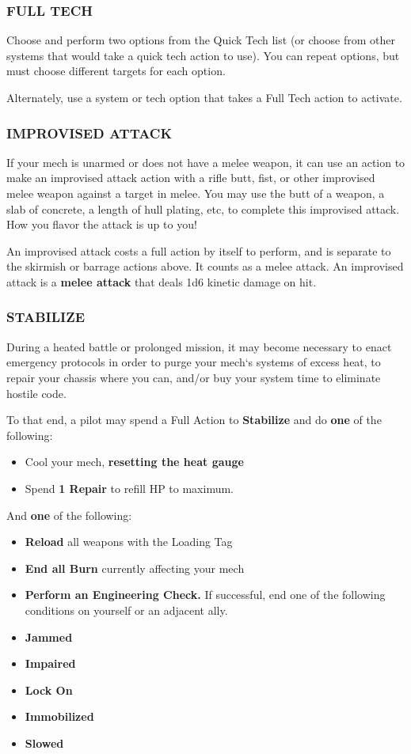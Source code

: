 \subsubsection{FULL TECH}
Choose and perform two options from the Quick Tech list (or choose from other systems that would take a quick tech action to use). You can repeat options, but must choose different targets for each option.

Alternately, use a system or tech option that takes a Full Tech action to activate.

\subsubsection{IMPROVISED ATTACK}

If your mech is unarmed or does not have a melee weapon, it can use an action to make an improvised attack action with a rifle butt, fist, or other improvised melee weapon against a target in melee. You may use the butt of a weapon, a slab of concrete, a length of hull plating, etc, to complete this improvised attack. How you flavor the attack is up to you!

An improvised attack costs a full action by itself to perform, and is separate to the skirmish or barrage actions above. It counts as a melee attack. An improvised attack is a \textbf{melee attack} that deals 1d6 kinetic damage on hit.

\subsubsection{STABILIZE}
During a heated battle or prolonged mission, it may become necessary to enact emergency protocols in order to purge your mech‘s systems of excess heat, to repair your chassis where you can, and/or buy your system time to eliminate hostile code.

To that end, a pilot may spend a Full Action to \textbf{Stabilize} and do \textbf{one} of the following:
\begin{itemize}
    \item Cool your mech, \textbf{resetting the heat gauge}
    \item Spend \textbf{1 Repair} to refill HP to maximum.
\end{itemize}
And \textbf{one} of the following:
\begin{itemize}
    \item \textbf{Reload} all weapons with the Loading Tag
    \item \textbf{End all Burn} currently affecting your mech
    \item \textbf{Perform an Engineering Check.} If successful, end one of the following conditions on yourself or an adjacent ally.
    \item \textbf{Jammed}
    \item \textbf{Impaired}
    \item \textbf{Lock On}
    \item \textbf{Immobilized}
    \item \textbf{Slowed}
\end{itemize}

